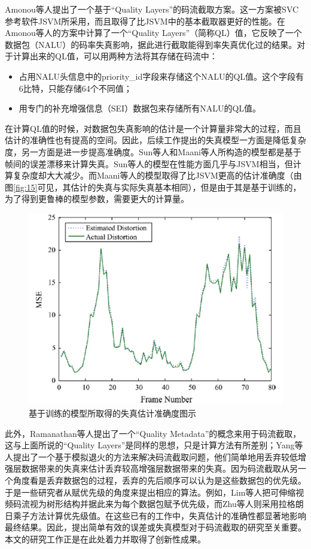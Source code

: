 Amonou等人\supercite{Amonou2007}提出了一个基于“Quality Layers”的码流截取方案。这一方案被SVC参考软件JSVM所采用，而且取得了比JSVM中的基本截取器更好的性能。在Amonou等人的方案中计算了一个“Quality Layers”（简称QL）值，它反映了一个数据包（NALU）的码率失真影响，据此进行截取能得到率失真优化过的结果。对于计算出来的QL值，可以用两种方法将其存储在码流中：

\begin{itemize}
\item 占用NALU头信息中的priority\_id字段来存储这个NALU的QL值。这个字段有6比特，只能存储64个不同值；
\item 用专门的补充增强信息（SEI）数据包来存储所有NALU的QL值。
\end{itemize}

在计算QL值的时候，对数据包失真影响的估计是一个计算量非常大的过程，而且估计的准确性也有提高的空间。因此，后续工作提出的失真模型一方面是降低复杂度，另一方面是进一步提高准确度。Sun等人\supercite{Sun2009}和Maani等人\supercite{Maani2009}所构造的模型都是基于帧间的误差漂移来计算失真。Sun等人的模型在性能方面几乎与JSVM相当，但计算复杂度却大大减少。而Maani等人的模型取得了比JSVM更高的估计准确度（由图\ref{fig:15}\supercite{Maani2009}可见，其估计的失真与实际失真基本相同），但是由于其是基于训练的，为了得到更鲁棒的模型参数，需要更大的计算量。

\begin{figure}[h]
	\centering
	\includegraphics[width = 0.8\linewidth]{clip/16.png}
	\caption{基于训练的模型所取得的失真估计准确度图示\label{fig:16}}
\end{figure}

此外，Ramanathan等人\supercite{Ramanathan2012}提出了一个“Quality Metadata”的概念来用于码流截取，这与上面所说的“Quality Layers”是同样的思想，只是计算方法有所差别；Yang等人\supercite{Yang2013}提出了一个基于模拟退火的方法来解决码流截取问题，他们简单地用丢弃较低增强层数据带来的失真来估计丢弃较高增强层数据带来的失真。因为码流截取从另一个角度看是丢弃数据包的过程，丢弃的先后顺序可以认为是这些数据包的优先级。于是一些研究者从赋优先级的角度来提出相应的算法。例如，Lim等人\supercite{Lim2006}把可伸缩视频码流视为树形结构并据此来为每个数据包赋予优先级，而Zhu等人\supercite{Zhu2011}则采用拉格朗日乘子方法计算优先级值。在这些已有的工作中，失真估计的准确性都显著地影响最终结果。因此，提出简单有效的误差或失真模型对于码流截取的研究至关重要。本文的研究工作正是在此处着力并取得了创新性成果。


